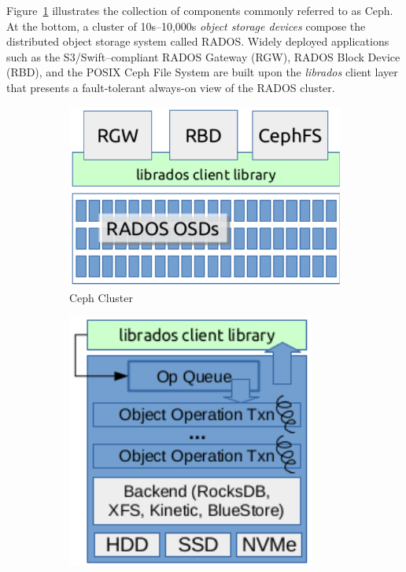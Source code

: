 \documentclass[10pt,twocolumn]{article}
\begin{document}
Figure~\ref{fig:ceph} illustrates the collection of components commonly
referred to as Ceph. At the bottom, a cluster of 10s--10,000s \emph{object
storage devices} compose the distributed object storage system called RADOS.
Widely deployed applications such as the S3/Swift--compliant RADOS Gateway
(RGW), RADOS Block Device (RBD), and the POSIX Ceph File System are built upon
the \emph{librados} client layer that presents a fault-tolerant always-on view
of the RADOS cluster.

\begin{figure}[t]
  \centering
  \begin{subfigure}[b]{.48\linewidth}
      \centering
      \includegraphics[width=1.0\linewidth]{figures/ceph}
      \caption{Ceph Cluster}
      \label{fig:ceph}
  \end{subfigure}\quad
  \begin{subfigure}[b]{.40\linewidth}
      \centering
      \includegraphics[width=1.0\linewidth]{figures/osd}

\end{subfigure}
\end{figure}
\end{document}
